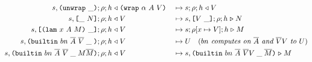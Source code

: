 \begin{figure*}[!ht]
\begin{subfigure}[c]{\linewidth}
{\begin{alignat*}{2}
      s,\texttt{(} \texttt{unwrap} ~ \_ \texttt{)}{}; \rho;h &\mathrel\triangleleft {\texttt{(} \texttt{wrap} ~ \alpha ~ A ~ V \texttt{)}} &{}\mapsto{}& s;\rho;h \mathrel\triangleleft V\\
      s,\texttt{[} \_ ~ N \texttt{]}; \rho;h &\mathrel\triangleleft V &{}\mapsto{}& s, \texttt{[} V ~ \_ \texttt{]};\rho;h \mathrel\triangleright N\\
      s,\texttt{[} \texttt{(} \texttt{lam} ~ x ~ A ~ M \texttt{)} ~ \_ \texttt{]}; \rho;h &\mathrel\triangleleft V &{}\mapsto{}& s;\rho[x\mapsto V];h \mathrel\triangleright M\\
      s,\texttt{(} \texttt{builtin} ~ bn ~ \overline{A} ~ \overline{V}\; \_\;  \texttt{)}; \rho; h &\mathrel\triangleleft V &{}\mapsto{}& U \quad (\textit{$bn$ computes on $\overline{A}$ and $\overline{V}V$ to $U$})\\
      s,  \texttt{(} \texttt{builtin} ~ bn ~ \overline{A} ~ \overline{V}\; \_\; M \overline{M} \texttt{)}{}; \rho; h
          &\mathrel\triangleleft V &{}\mapsto{}& s, \texttt{(} \texttt{builtin} ~ bn ~ \overline{A} ~ \overline{V} V\; \_\; \overline{M} \texttt{)} \mathrel\triangleright M\\
\end{alignat*}
}
\end{subfigure}
\end{figure*}


